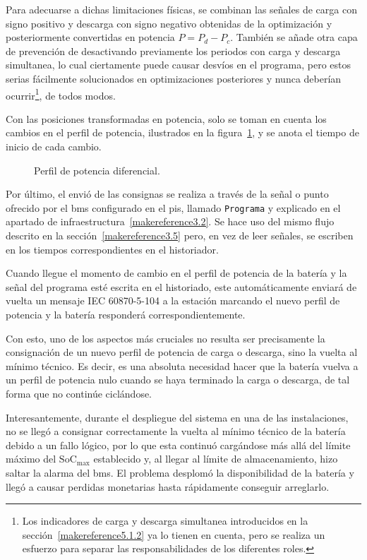 Para adecuarse a dichas limitaciones físicas, se combinan las señales de carga con signo positivo y descarga con signo negativo obtenidas de la optimización y posteriormente convertidas en potencia \( P = P_{d} - P_{c} \). También se añade otra capa de prevención de desactivando previamente los periodos con carga y descarga simultanea, lo cual ciertamente puede causar desvíos en el programa, pero estos serias fácilmente solucionados en optimizaciones posteriores y nunca deberían ocurrir\footnote{Los indicadores de carga y descarga simultanea introducidos en la sección~\ref{makereference5.1.2} ya lo tienen en cuenta, pero se realiza un esfuerzo para separar las responsabilidades de los diferentes roles.}, de todos modos.

Con las posiciones transformadas en potencia, solo se toman en cuenta los cambios en el perfil de potencia, ilustrados en la figura~\ref{fig:diferencia-perfil-potencia}, y se anota el tiempo de inicio de cada cambio.

\begin{figure}
  \centering
  \caption[Perfil de potencia diferencial.]{Perfil de potencia diferencial.}
  \label{fig:diferencia-perfil-potencia}
\end{figure}

Por último, el envió de las consignas se realiza a través de la señal o punto ofrecido por el \gls{bms} configurado en el \gls{pis}, llamado \texttt{Programa} y explicado en el apartado de infraestructura~\ref{makereference3.2}. Se hace uso del mismo flujo descrito en la sección~\ref{makereference3.5} pero, en vez de leer señales, se escriben en los tiempos correspondientes en el historiador.

Cuando llegue el momento de cambio en el perfil de potencia de la batería y la señal del programa esté escrita en el historiado, este automáticamente enviará de vuelta un mensaje IEC 60870-5-104 a la estación marcando el nuevo perfil de potencia y la batería responderá correspondientemente.

Con esto, uno de los aspectos más cruciales no resulta ser precisamente la consignación de un nuevo perfil de potencia de carga o descarga, sino la vuelta al mínimo técnico. Es decir, es una absoluta necesidad hacer que la batería vuelva a un perfil de potencia nulo cuando se haya terminado la carga o descarga, de tal forma que no continúe ciclándose.

Interesantemente, durante el despliegue del sistema en una de las instalaciones, no se llegó a consignar correctamente la vuelta al mínimo técnico de la batería debido a un fallo lógico, por lo que esta continuó cargándose más allá del límite máximo del \( \mathrm{SoC}_{\text{max}} \) establecido y, al llegar al límite de almacenamiento, hizo saltar la alarma del \gls{bms}. El problema desplomó la disponibilidad de la batería y llegó a causar perdidas monetarias hasta rápidamente conseguir arreglarlo.

